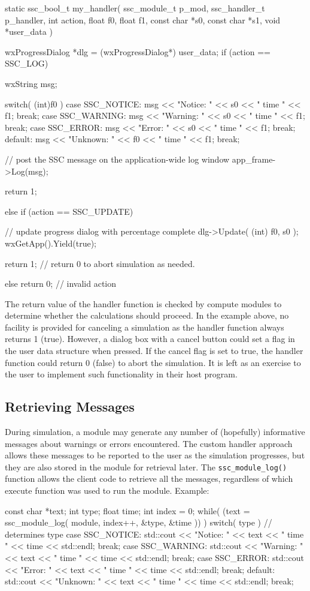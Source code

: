 \documentclass{article}
\begin{document}
\begin{verbatimtab}[4]
static ssc_bool_t my_handler( ssc_module_t p_mod, ssc_handler_t p_handler, int action, 
	float f0, float f1, const char *s0, const char *s1, void *user_data )
{
	wxProgressDialog *dlg = (wxProgressDialog*) user_data;
	if (action == SSC_LOG)
	{
		wxString msg;

		switch( (int)f0 )
		{
		case SSC_NOTICE: msg << "Notice: " << s0 << " time " << f1; break;
		case SSC_WARNING: msg << "Warning: " << s0 << " time " << f1; break;
		case SSC_ERROR: msg << "Error: " << s0 << " time " << f1; break;
		default: msg << "Unknown: " << f0 << " time " << f1; break;
		}

		// post the SSC message on the application-wide log window 
		app_frame->Log(msg);

		return 1;
	}
	else if (action == SSC_UPDATE)
	{
 		// update progress dialog with percentage complete
		dlg->Update( (int) f0, s0 );
		wxGetApp().Yield(true);

		return 1; // return 0 to abort simulation as needed.
	}
	else
		return 0; // invalid action
}
\end{verbatimtab}

The return value of the handler function is checked by compute modules to determine whether the calculations should proceed.  In the example above, no facility is provided for canceling a simulation as the handler function always returns 1 (true).  However, a dialog box with a cancel button could set a flag in the user data structure when pressed.  If the cancel flag is set to true, the handler function could return 0 (false) to abort the simulation.  It is left as an exercise to the user to implement such functionality in their host program.

\subsection{Retrieving Messages}
\label{sec_messages}

During simulation, a module may generate any number of (hopefully) informative messages about warnings or errors encountered.  The custom handler approach allows these messages to be reported to the user as the simulation progresses, but they are also stored in the module for retrieval later.  The \texttt{ssc\_module\_log()} function allows the client code to retrieve all the messages, regardless of which execute function was used to run the module.  Example:

\begin{verbatimtab}[4]
const char *text;
int type;
float time;
int index = 0;
while( (text = ssc_module_log( module, index++, &type, &time )) )
{
	switch( type ) // determines type
	{
	case SSC_NOTICE: 
		std::cout << "Notice: " << text << " time " << time << std::endl; 
		break;
	case SSC_WARNING: 
		std::cout << "Warning: " << text << " time " << time << std::endl; 
		break;
	case SSC_ERROR: 
		std::cout << "Error: " << text << " time " << time << std::endl; 
		break;
	default: 
		std::cout << "Unknown: " << text << " time " << time << std::endl; 
		break;
	}
}
\end{verbatimtab}
\end{document}
